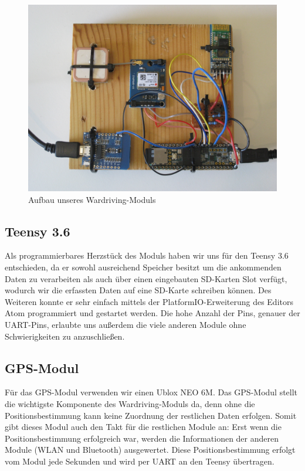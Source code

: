\documentclass[a4paper,11pt, ngerman]{scrartcl}
\begin{document}
\begin{figure}[H]
	\includegraphics[width=.95\linewidth]{Aufbau.JPG}\caption{Aufbau unseres Wardriving-Moduls}\label{abb:compl}
\end{figure}

\subsection{Teensy 3.6}
Als programmierbares \grqq Herzstück\grqq{} des Moduls haben wir uns für den Teensy 3.6 entschieden, da er sowohl ausreichend Speicher besitzt um die ankommenden Daten zu verarbeiten als auch über einen eingebauten SD-Karten Slot verfügt, wodurch wir die erfassten Daten auf eine SD-Karte schreiben können. Des Weiteren konnte er sehr einfach mittels der \grqq PlatformIO\grqq{}-Erweiterung des Editors \grqq Atom\grqq{} programmiert und gestartet werden. Die hohe Anzahl der Pins, genauer der UART-Pins, erlaubte uns außerdem die viele anderen Module ohne Schwierigkeiten zu anzuschließen.
\subsection{GPS-Modul}
Für das GPS-Modul verwenden wir einen Ublox NEO 6M.
Das GPS-Modul stellt die wichtigste Komponente des Wardriving-Moduls da, denn ohne die Positionsbestimmung kann keine Zuordnung der restlichen Daten erfolgen. Somit gibt dieses Modul auch den \grqq Takt\grqq{} für die restlichen Module an: Erst wenn die Positionsbestimmung erfolgreich war, werden die Informationen der anderen Module (WLAN und Bluetooth) ausgewertet. Diese Positionsbestimmung erfolgt vom Modul jede Sekunden und wird per UART an den Teensy übertragen.
\end{document}
